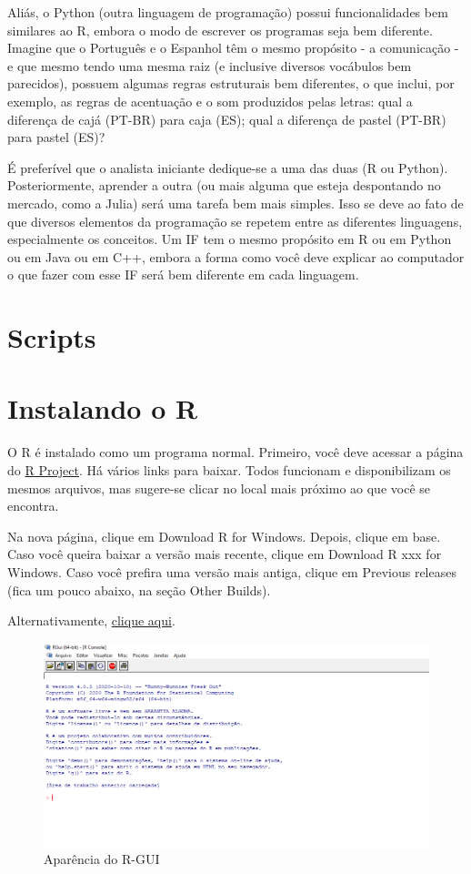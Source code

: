 \documentclass[
]{book}
\begin{document}
Aliás, o Python (outra linguagem de programação) possui funcionalidades bem similares ao R, embora o modo de escrever os programas seja bem diferente. Imagine que o Português e o Espanhol têm o mesmo propósito - a comunicação - e que mesmo tendo uma mesma raiz (e inclusive diversos vocábulos bem parecidos), possuem algumas regras estruturais bem diferentes, o que inclui, por exemplo, as regras de acentuação e o som produzidos pelas letras: qual a diferença de cajá (PT-BR) para caja (ES); qual a diferença de pastel (PT-BR) para pastel (ES)?

É preferível que o analista iniciante dedique-se a uma das duas (R ou Python). Posteriormente, aprender a outra (ou mais alguma que esteja despontando no mercado, como a Julia) será uma tarefa bem mais simples. Isso se deve ao fato de que diversos elementos da programação se repetem entre as diferentes linguagens, especialmente os conceitos. Um IF tem o mesmo propósito em R ou em Python ou em Java ou em C++, embora a forma como você deve explicar ao computador o que fazer com esse IF será bem diferente em cada linguagem.

\hypertarget{scripts}{%
\section{Scripts}\label{scripts}}

\hypertarget{instalando-o-r}{%
\section{Instalando o R}\label{instalando-o-r}}

O R é instalado como um programa normal. Primeiro, você deve acessar a página do \href{https://cran.r-project.org/mirrors.html}{R Project}. Há vários links para baixar. Todos funcionam e disponibilizam os mesmos arquivos, mas sugere-se clicar no local mais próximo ao que você se encontra.

Na nova página, clique em Download R for Windows. Depois, clique em base. Caso você queira baixar a versão mais recente, clique em Download R xxx for Windows. Caso você prefira uma versão mais antiga, clique em Previous releases (fica um pouco abaixo, na seção Other Builds).

Alternativamente, \href{https://vps.fmvz.usp.br/CRAN/bin/windows/base/release.html}{clique aqui}.

\begin{figure}
\centering
\includegraphics{r-gui.PNG}
\caption{Aparência do R-GUI}
\end{figure}
\end{document}

